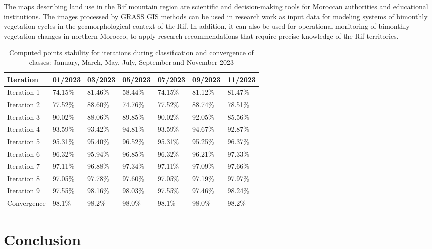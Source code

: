 \documentclass[geomatics,article,submit,pdftex,moreauthors]{Definitions/mdpi}
\begin{document}
The maps describing land use in the Rif mountain region are scientific and decision-making tools for Moroccan authorities and educational institutions. The images processed by GRASS GIS methods can be used in research work as input data for modeling systems of bimonthly vegetation cycles in the geomorphological context of the Rif. In addition, it can also be used for operational monitoring of bimonthly vegetation changes in northern Morocco, to apply research recommendations that require precise knowledge of the Rif territories.

\begin{table}[H]
\centering
\begin{tabularx}{\textwidth}{| p{1.7cm} | X | X | X | X | X | X | }
  \toprule
   Iteration & 01/2023 & 03/2023 & 05/2023 & 07/2023 & 09/2023 & 11/2023  \\
   \midrule
    Iteration 1 & 74.15\% & 81.46\% & 58.44\% & 74.15\% & 81.12\% & 81.47\% \\
    Iteration 2 & 77.52\% & 88.60\% & 74.76\% & 77.52\% & 88.74\% & 78.51\% \\
    Iteration 3 & 90.02\% & 88.06\% & 89.85\% & 90.02\% & 92.05\% & 85.56\% \\
    Iteration 4 & 93.59\% & 93.42\% & 94.81\% & 93.59\% & 94.67\% & 92.87\% \\
    Iteration 5 & 95.31\% & 95.40\% & 96.52\% & 95.31\% & 95.25\% & 96.37\% \\
    Iteration 6 & 96.32\% & 95.94\% & 96.85\% & 96.32\% & 96.21\% & 97.33\% \\
    Iteration 7 & 97.11\% & 96.88\% & 97.34\% & 97.11\% & 97.09\% & 97.66\% \\
    Iteration 8 & 97.05\% & 97.78\% & 97.60\% & 97.05\% & 97.19\% & 97.97\% \\
    Iteration 9 & 97.55\% & 98.16\% & 98.03\% & 97.55\% & 97.46\% & 98.24\% \\
    \midrule
    Convergence & 98.1\% & 98.2\% & 98.0\% & 98.1\% & 98.0\% & 98.2\% \\
    \bottomrule
\end{tabularx}
\caption{Computed points stability for iterations during classification and convergence of classes: January, March, May, July, September and November 2023}\label{tabA06}
\end{table}

\section{Conclusion}
\end{document}
